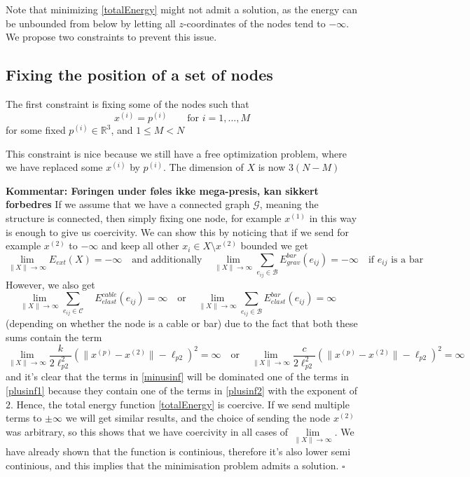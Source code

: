 \documentclass[11pt]{article}
\newcommand{\sumset}[1]{\sum\limits_{e_{ij} \in \mathcal{#1}}}
\newcommand{\ebe}{E^{bar}_{elast}(e_{ij})}
\newcommand{\ebg}{E^{bar}_{grav}(e_{ij})}
\newcommand{\ece}{E^{cable}_{elast}(e_{ij})}
\newcommand{\ee}{E_{ext}(X)}
\newcommand{\xinf}{\lim\limits_{\rVert X \lVert \to \infty}}
\begin{document}
Note that minimizing \eqref{totalEnergy} might not admit a solution, as the energy can be unbounded from below by letting all $z$-coordinates of the nodes tend to $-\infty$. We propose two constraints to prevent this issue. 

\subsection{Fixing the position of a set of nodes}
The first constraint is fixing some of the nodes such that 
\begin{equation}
    x^{(i)} = p^{(i)} \qquad \text{for } i = 1,...,M
\end{equation} for some fixed $p^{(i)} \in \mathbb{R}^3$, and $1\leq M < N$

This constraint is nice because we still have a free optimization problem, where we have replaced some $x^{(i)}$ by $p^{(i)}$. The dimension of $X$ is now $3(N-M)$

\textbf{Kommentar: Føringen under føles ikke mega-presis, kan sikkert forbedres}
If we assume that we have a connected graph $\mathcal{G}$, meaning the structure is connected, then simply fixing one node, for example $x^{(1)}$ in this way is enough to give us coercivity. We can show this by noticing that if we send for example $x^{(2)}$ to $-\infty$ and keep all other $x_i \in X \setminus x^{(2)}$ bounded we get 
\begin{equation}
  \xinf \ee = -\infty
\quad\text{and additionally}\quad 
\xinf \sumset{B} \ebg = -\infty \quad \text{if $e_{ij}$ is a bar}
\label{minusinf}
\end{equation} 
However, we also get 
\begin{equation}
     \xinf \sumset{C}\quad \ece = \infty \quad \text{or}\quad \xinf \sumset{B }\ebe = \infty \quad 
     \label{plusinf1}
\end{equation} (depending on whether the node is a cable or bar)
due to the fact that both these sums contain the term \begin{equation}
 \xinf \frac{k}{2 \ell_{p2}^2}(\lVert x^{(p)} - x^{(2)} \rVert-\ell_{p2})^2 = \infty \quad \text{or} \quad \xinf \frac{c}{2 \ell_{p2}^2}(\lVert x^{(p)} - x^{(2)} \rVert-\ell_{p2})^2 = \infty
 \label{plusinf2}
\end{equation}
and it's clear that the terms in \eqref{minusinf} will be dominated one of the terms in \eqref{plusinf1} because they contain one of the terms in \eqref{plusinf2} with the exponent of $2$. Hence, the total energy function \eqref{totalEnergy} is coercive. If we send multiple terms to $\pm \infty$ we will get similar results, and the choice of sending the node $x^{(2)}$ was arbitrary, so this shows that we have coercivity in all cases of $\xinf$. We have already shown that the function is continious, therefore it's also lower semi continious, and this implies that the minimisation problem admits a solution. $\square$
\end{document}

